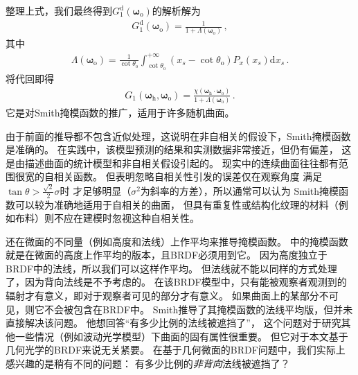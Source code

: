 整理上式，我们最终得到$G_1^{\mathrm{d}}({\bm\omega}_{\mathrm{o}})$的解析解为
\begin{align}\label{eq:08-ex01-g1-d-solution}
    G_1^{\mathrm{d}}({\bm\omega}_{\mathrm{o}})=\frac{1}{1+\Lambda({\bm\omega}_{\mathrm{o}})}\, ,
\end{align}
其中
\begin{align}\label{eq:08-ex01-Lambda-function}
    \Lambda({\bm\omega}_{\mathrm{o}})=\frac{1}{\cot\theta_{\mathrm{o}}}
    \int_{\cot\theta_{\mathrm{o}}}^{+\infty}(x_s-\cot\theta_{\mathrm{o}})P_x(x_s)\mathrm{d}x_s\, .
\end{align}
将代回即得
\begin{align}\label{eq:08-ex01-Smith-masking-function}
    G_1({\bm\omega}_{\mathrm{h}},{\bm\omega}_{\mathrm{o}})
    =\frac{\chi({\bm\omega}_{\mathrm{h}}\cdot{\bm\omega}_{\mathrm{o}})}
    {1+\Lambda({\bm\omega}_{\mathrm{o}})}\, .
\end{align}
它是对Smith掩模函数的推广，适用于许多随机曲面。

由于前面的推导都不包含近似处理，这说明在非自相关的假设下，Smith掩模函数是准确的。
在实践中，该模型预测的结果和实测数据非常接近，但仍有偏差，
这是由描述曲面的统计模型和非自相关假设引起的。
现实中的连续曲面往往都有范围很宽的自相关函数。
但\citet{841905}表明忽略自相关性引发的误差仅在观察角度
满足$\tan\theta>\frac{\sqrt{2}}{2}\sigma$时
才足够明显（$\sigma^2$为斜率的方差），所以通常可以认为
Smith掩模函数可以较为准确地适用于自相关的曲面，
但具有重复性或结构化纹理的材料（例如布料）则不应在建模时忽视这种自相关性。

\citet{1138991}还在微面的不同量（例如高度和法线）上作平均来推导掩模函数。
中的掩模函数
就是在微面的高度上作平均的版本，且BRDF必须用到它。
因为高度独立于BRDF中的法线，所以我们可以这样作平均。
但法线就不能以同样的方式处理了，因为背向法线是不予考虑的。
在该BRDF模型中，只有能被观察者观测到的辐射才有意义，即对于观察者可见的部分才有意义。
如果曲面上的某部分不可见，则它不会被包含在BRDF中。
Smith推导了其掩模函数的法线平均版，但并未直接解决该问题。
他想回答“有多少比例的法线被遮挡了”，
这个问题对于研究其他一些情况（例如波动光学模型）下曲面的固有属性很重要。
但它对于本文基于几何光学的BRDF来说无关紧要。
在基于几何微面的BRDF问题中，我们实际上感兴趣的是稍有不同的问题：
有多少比例的\emph{非背向}法线被遮挡了？

